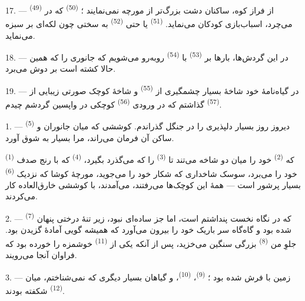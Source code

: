 17. --- از فراز کوه، ساکنان دشت بزرگ‌تر از مورچه نمی‌نمایند ؛
 \textsuperscript{(50)} که در 
\textsuperscript{(49)} می‌چرد، اسباب‌بازی کودکان می‌نماید. 
\textsuperscript{(51)} یا حتی  \textsuperscript{(52)}
به سختی چون لکه‌ای بر سبزه می‌نماید.

18. --- در این گردش‌ها، بارها بر 
\textsuperscript{(53)} با  \textsuperscript{(54)}
روبه‌رو می‌شویم که جانوری را که همین حالا کشته است بر دوش می‌برد.

19. --- در گیاه‌نامهٔ خود شاخهٔ بسیار چشمگیری از 
\textsuperscript{(55)} و شاخهٔ کوچک صورتی زیبایی از 
\textsuperscript{(57)} گذاشتم که در ورودی 
\textsuperscript{(56)} کوچکی در واپسین گردشم چیدم.

\VUsaut{3.0mm}
\VUsaut{3.0mm}

\VUsaut{3.0mm}
\VUsaut{3.0mm}

1. --- دیروز روز بسیار دلپذیری را در جنگل گذراندم. کوششی که میان
جانوران و  \textsuperscript{(5)} ساکن آن فرمان
می‌راند، مرا بسیار به شوق آورد.

 \textsuperscript{(1)} که 
\textsuperscript{(2)} خود را میان دو شاخه می‌تند تا 
\textsuperscript{(3)} را که می‌گذرد بگیرد، 
\textsuperscript{(4)} که با رنج صدف خود را می‌برد، سوسک شاخداری که
شکار خود را می‌جوید، مورچهٔ کوشا که نزدیک 
\textsuperscript{(6)} بسیار پرشور است — همهٔ این کوچک‌ها می‌رفتند،
می‌آمدند، با کوششی خارق‌العاده کار می‌کردند.

2. ---  \textsuperscript{(7)} که در نگاه نخست پنداشتم
 است، اما جز  ساده‌ای نبود، زیر تنهٔ
درختی پنهان شده بود و گاه‌گاه سر باریک خود را بیرون می‌آورد که همیشه
گویی آمادهٔ گزیدن بود. جلوِ من  \textsuperscript{(8)}
بزرگی سنگین می‌خزید، پس از آنکه یکی از 
\textsuperscript{(11)} خوشمزه را خورده بود که فراوان آنجا می‌رویند.

3. --- زمین با  فرش شده بود ؛ 
\textsuperscript{(9)}،  \textsuperscript{(10)}، و
گیاهان بسیار دیگری که نمی‌شناختم، میان 
\textsuperscript{(12)} شکفته بودند.

